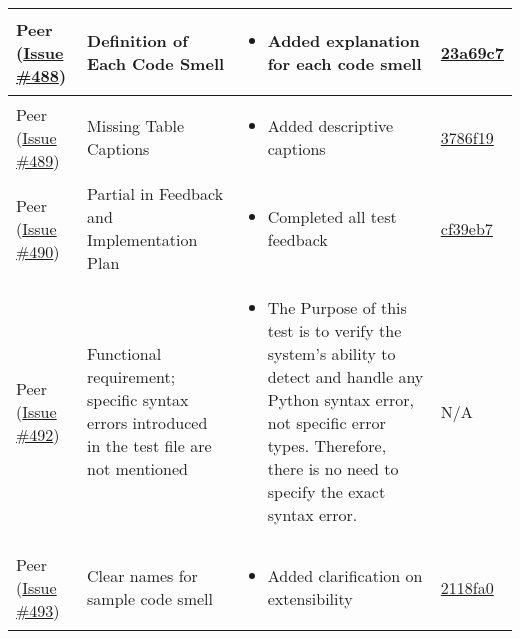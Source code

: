 \documentclass{article}
\begin{document}
\begin{longtable}{|p{2cm}|p{3.5cm}|p{4.5cm}|p{3cm}|}
    Peer (\href{https://github.com/ssm-lab/capstone--source-code-optimizer/issues/488}{Issue \#488}) & 
    Definition of Each Code Smell &
    \begin{itemize}[nosep,leftmargin=*]
        \item Added explanation for each code smell 
    \end{itemize}
    & \href{https://github.com/ssm-lab/capstone--source-code-optimizer/commit/23a69c71a17c7213af65fb157f7bf75cbef331ba}{23a69c7} \\
    \hline
    
    Peer (\href{https://github.com/ssm-lab/capstone--source-code-optimizer/issues/489}{Issue \#489}) & 
    Missing Table Captions &
    \begin{itemize}[nosep,leftmargin=*]
        \item Added descriptive captions
    \end{itemize} &
    \href{https://github.com/ssm-lab/capstone--source-code-optimizer/commit/3786f19d94dcc60efd35a35681573bb2851c65fb}{3786f19} \\
    \hline
    
    Peer (\href{https://github.com/ssm-lab/capstone--source-code-optimizer/issues/490}{Issue \#490}) & 
    Partial in Feedback and Implementation Plan &
    \begin{itemize}[nosep,leftmargin=*]
        \item Completed all test feedback
    \end{itemize} &
    \href{https://github.com/ssm-lab/capstone--source-code-optimizer/commit/cf39eb73bbd66b1725e1a25303fe1906b0a7cd38}{cf39eb7} \\
    \hline
    
    Peer (\href{https://github.com/ssm-lab/capstone--source-code-optimizer/issues/492}{Issue \#492}) & 
    Functional requirement; specific syntax errors introduced in the test file are not mentioned &
    \begin{itemize}[nosep,leftmargin=*]
        \item The Purpose of this test is to verify the system's ability to detect and handle any Python syntax error, not specific error types. Therefore, there is no need to specify the exact syntax error.
    \end{itemize} &
    N/A \\
    \hline
    
    Peer (\href{https://github.com/ssm-lab/capstone--source-code-optimizer/issues/493}{Issue \#493}) & 
    Clear names for sample code smell &
    \begin{itemize}[nosep,leftmargin=*]
        \item Added clarification on extensibility
    \end{itemize} &
    \href{https://github.com/ssm-lab/capstone--source-code-optimizer/commit/2118fa0bd79ad6c9e09af42395746c01b6b4c771}{2118fa0} \\
    \hline
    

\end{longtable}
\end{document}
